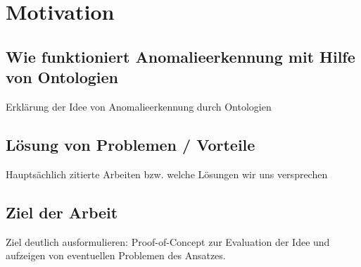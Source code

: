 \chapter{Motivation}
\section{Wie funktioniert Anomalieerkennung mit Hilfe von Ontologien}
Erklärung der Idee von Anomalieerkennung durch Ontologien
\section{Lösung von Problemen / Vorteile}
Hauptsächlich zitierte Arbeiten bzw. welche Lösungen wir uns versprechen
\section{Ziel der Arbeit}
Ziel deutlich ausformulieren: Proof-of-Concept zur Evaluation der Idee und aufzeigen von eventuellen Problemen des Ansatzes.